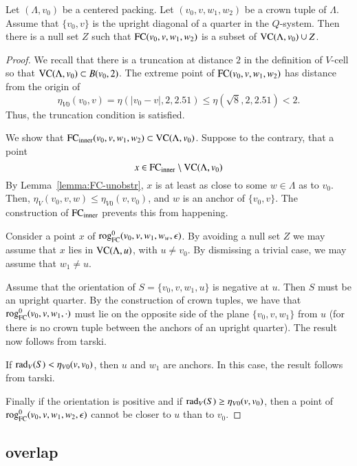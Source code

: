 \begin{lemma}  
Let $(\Lambda,v_0)$ be a centered packing.
Let $(v_0,v,w_1,w_2)$ be a crown tuple of $\Lambda$. Assume that
 $\{v_0,v\}$ is the upright diagonal of a quarter
in the $Q$-system.  Then there is a null set $Z$ such
that ${\operatorname{FC}}(v_0,v,w_1,w_2)$ is
a subset of ${\operatorname{VC}}(\Lambda,v_0)\cup Z$.
\end{lemma}

\begin{proof}
We recall that there is a truncation at distance $2$ in the definition
of $V$-cell so that ${\operatorname{VC}}(\Lambda,v_0)\subset B(v_0,2)$.
The extreme point of ${\operatorname{FC}}(v_0,v,w_1,w_2)$ has distance from the origin of
 $$\eta_{V0}(v_0,v) = \eta(|v_0-v|,2,2.51)\le \eta(\sqrt8,2,2.51) < 2.$$
Thus, the truncation condition is satisfied.

We show that ${\operatorname{FC}}_{\text{inner}}(v_0,v,w_1,w_2)\subset{\operatorname{VC}}(\Lambda,v_0)$.
Suppose to the contrary, that a point 
  $$x\in {\operatorname{FC}}_{\text{inner}}\setminus {\operatorname{VC}}(\Lambda,v_0)$$
By Lemma~\ref{lemma:FC-unobstr},  $x$ is at least as close
to some $w\in\Lambda$ as to  $v_0$.  
Then, $\eta_V(v_0,v,w)\le\eta_{V0}(v,v_0)$, and $w$
is an anchor of $\{v_0,v\}$.  The construction of
${\operatorname{FC}}_{\text{inner}}$ prevents this from happening.

Consider a point $x$ of ${\operatorname{rog}}^0_{\text{FC}}(v_0,v,w_1,w_w,\epsilon)$.
By avoiding a null set $Z$ we may assume that $x$ lies in
${\operatorname{VC}}(\Lambda,u)$, with $u\ne v_0$.  
By dismissing a trivial case, we may
assume that $w_1\ne u$.

Assume that the orientation of $S=\{v_0,v,w_1,u\}$ is negative at $u$.  
Then $S$ must be an upright quarter.  By
the construction of crown tuples, we have that ${\operatorname{rog}}^0_{\text{FC}}(v_0,v,w_1,\cdot)$ must
lie on the opposite side of the plane $\{v_0,v,w_1\}$ from $u$ (for
there is no crown tuple between the anchors of an upright quarter).  The
result now follows from tarski.

If $\operatorname{rad}_V(S) <\eta_{V0}(v,v_0)$, then $u$ and $w_1$ are anchors.  In
this case, the result follows from tarski.

Finally if the orientation is positive and if $\operatorname{rad}_V(S)\ge
\eta_{V0}(v,v_0)$, then a point of ${\operatorname{rog}}^0_{\text{FC}}(v_0,v,w_1,w_2,\epsilon)$ cannot be closer to $u$ than
to $v_0$.
\end{proof}


\subsection{overlap}%
    \label{sec:overlap}


